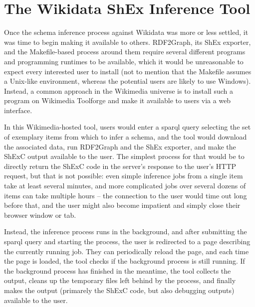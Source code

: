 
\chapter{The Wikidata ShEx Inference Tool}
\label{ch:wdsi}


Once the schema inference process against Wikidata was more or less settled,
it was time to begin making it available to others. %
RDF2Graph, its ShEx exporter, and the Makefile-based process around them
require several different programs and programming runtimes to be available,
which it would be unreasonable to expect every interested user to install
(not to mention that the Makefile assumes a Unix-like environment,
whereas the potential users are likely to use Windows).
Instead, a common approach in the Wikimedia universe
is to install such a program on Wikimedia Toolforge
and make it available to users via a web interface.

In this Wikimedia-hosted tool,
users would enter a \gls{sparql} query selecting the set of exemplary items from which to infer a schema,
and the tool would download the associated data,
run RDF2Graph and the ShEx exporter,
and make the ShExC output available to the user.
The simplest process for that would be
to directly return the ShExC code in the server’s response to the user’s HTTP request,
but that is not possible:
even simple inference jobs %
from a single item take at least several minutes,
and more complicated jobs %
over several dozens of items can take multiple hours –
the connection to the user would time out long before that,
and the user might also become impatient and simply close their browser window or tab.

Instead, the inference process runs in the background,
and after submitting the \gls{sparql} query and starting the process,
the user is redirected to a page describing the currently running job.
They can periodically reload the page,
and each time the page is loaded,
the tool checks if the background process is still running.
If the background process has finished in the meantime,
the tool collects the output,
cleans up the temporary files left behind by the process,
and finally makes the output
(primarely the ShExC code, but also debugging outputs)
available to the user.

